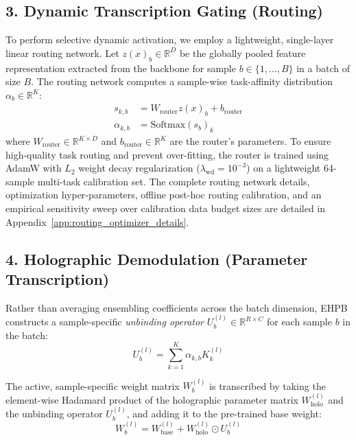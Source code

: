 \subsection{3. Dynamic Transcription Gating (Routing)}

To perform selective dynamic activation, we employ a lightweight, single-layer linear routing network. Let $z(x)_b \in \mathbb{R}^D$ be the globally pooled feature representation extracted from the backbone for sample $b \in \{1, \dots, B\}$ in a batch of size $B$. The routing network computes a sample-wise task-affinity distribution $\alpha_b \in \mathbb{R}^K$:
\begin{align}
s_{k, b} &= W_{\text{router}} z(x)_b + b_{\text{router}} \\
\alpha_{k, b} &= \text{Softmax}\left( s_{b} \right)_k
\end{align}
where $W_{\text{router}} \in \mathbb{R}^{K \times D}$ and $b_{\text{router}} \in \mathbb{R}^K$ are the router's parameters. To ensure high-quality task routing and prevent over-fitting, the router is trained using AdamW with $L_2$ weight decay regularization ($\lambda_{\text{wd}} = 10^{-3}$) on a lightweight 64-sample multi-task calibration set. The complete routing network details, optimization hyper-parameters, offline post-hoc routing calibration, and an empirical sensitivity sweep over calibration data budget sizes are detailed in Appendix~\ref{app:routing_optimizer_details}.

\subsection{4. Holographic Demodulation (Parameter Transcription)}

Rather than averaging ensembling coefficients across the batch dimension, EHPB constructs a sample-specific \textit{unbinding operator} $U_b^{(l)} \in \mathbb{R}^{R \times C}$ for each sample $b$ in the batch:
\begin{equation}
U_b^{(l)} = \sum_{k=1}^K \alpha_{k, b} K_k^{(l)}
\end{equation}

The active, sample-specific weight matrix $W_b^{(l)}$ is transcribed by taking the element-wise Hadamard product of the holographic parameter matrix $W_{\text{holo}}^{(l)}$ and the unbinding operator $U_b^{(l)}$, and adding it to the pre-trained base weight:
\begin{equation}
W_b^{(l)} = W_{\text{base}}^{(l)} + W_{\text{holo}}^{(l)} \odot U_b^{(l)}
\end{equation}

